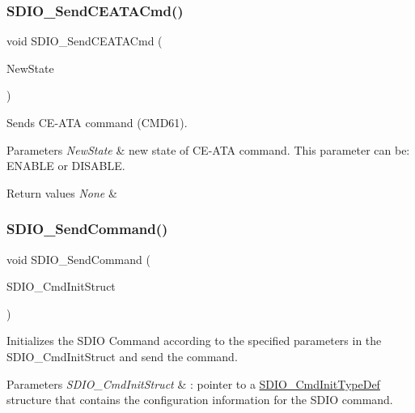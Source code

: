 \subsubsection{\texorpdfstring{SDIO\_SendCEATACmd()}{SDIO\_SendCEATACmd()}}
{\footnotesize\ttfamily void S\+D\+I\+O\+\_\+\+Send\+C\+E\+A\+T\+A\+Cmd (\begin{DoxyParamCaption}\item[{\mbox{\hyperlink{group___exported__types_gac9a7e9a35d2513ec15c3b537aaa4fba1}{Functional\+State}}}]{New\+State }\end{DoxyParamCaption})}



Sends C\+E-\/\+A\+TA command (C\+M\+D61). 


\begin{DoxyParams}{Parameters}
{\em New\+State} & new state of C\+E-\/\+A\+TA command. This parameter can be\+: E\+N\+A\+B\+LE or D\+I\+S\+A\+B\+LE. \\
\hline
\end{DoxyParams}

\begin{DoxyRetVals}{Return values}
{\em None} & \\
\hline
\end{DoxyRetVals}
\mbox{\label{group___s_d_i_o___exported___functions_ga7117d2f702703f6c0a66bc07707cab23}} 
\subsubsection{\texorpdfstring{SDIO\_SendCommand()}{SDIO\_SendCommand()}}
{\footnotesize\ttfamily void S\+D\+I\+O\+\_\+\+Send\+Command (\begin{DoxyParamCaption}\item[{\mbox{\hyperlink{struct_s_d_i_o___cmd_init_type_def}{S\+D\+I\+O\+\_\+\+Cmd\+Init\+Type\+Def}} $\ast$}]{S\+D\+I\+O\+\_\+\+Cmd\+Init\+Struct }\end{DoxyParamCaption})}



Initializes the S\+D\+IO Command according to the specified parameters in the S\+D\+I\+O\+\_\+\+Cmd\+Init\+Struct and send the command. 


\begin{DoxyParams}{Parameters}
{\em S\+D\+I\+O\+\_\+\+Cmd\+Init\+Struct} & \+: pointer to a \mbox{\hyperlink{struct_s_d_i_o___cmd_init_type_def}{S\+D\+I\+O\+\_\+\+Cmd\+Init\+Type\+Def}} structure that contains the configuration information for the S\+D\+IO command. \\
\hline
\end{DoxyParams}

